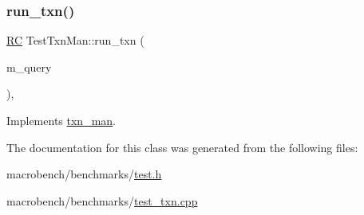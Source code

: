 \subsubsection{\texorpdfstring{run\+\_\+txn()}{run\_txn()}\hspace{0.1cm}{\footnotesize\ttfamily [2/2]}}
{\footnotesize\ttfamily \hyperlink{global_8h_a78c49a674c810fdd03d20432f7be864a}{RC} Test\+Txn\+Man\+::run\+\_\+txn (\begin{DoxyParamCaption}\item[{\hyperlink{classbase__query}{base\+\_\+query} $\ast$}]{m\+\_\+query }\end{DoxyParamCaption})\hspace{0.3cm}{\ttfamily [inline]}, {\ttfamily [virtual]}}



Implements \hyperlink{classtxn__man_a71142ded36a4be5629ea75d486a105ae}{txn\+\_\+man}.



The documentation for this class was generated from the following files\+:\begin{DoxyCompactItemize}
\item 
macrobench/benchmarks/\hyperlink{test_8h}{test.\+h}\item 
macrobench/benchmarks/\hyperlink{test__txn_8cpp}{test\+\_\+txn.\+cpp}\end{DoxyCompactItemize}
